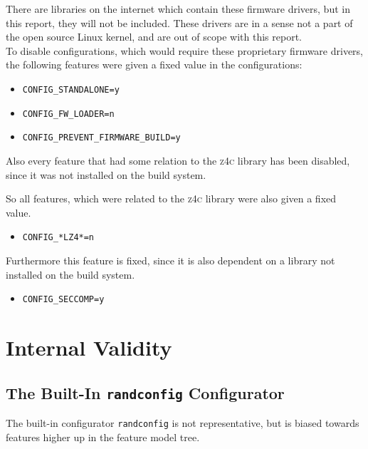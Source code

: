 \documentclass[a4paper,11pt]{report}
\newcommand{\textcode}[1]{\fboxsep=1pt\texttt{\colorbox{gray!20}{#1}}}
\begin{document}
There are libraries on the internet which contain these firmware drivers, but 
in this report, they will not be included. These drivers are in a sense not a 
part of the open source Linux kernel, and are out of scope with this report.
\\

To disable configurations, which would require these proprietary firmware 
drivers, the following features were given a fixed value in the configurations:

\begin{itemize}
    \item \textcode{CONFIG\_STANDALONE=y}
    \item \textcode{CONFIG\_FW\_LOADER=n}
    \item \textcode{CONFIG\_PREVENT\_FIRMWARE\_BUILD=y}
\end{itemize}


Also every feature that had some relation to the \textsc{z4c} library has been 
disabled, since it was not installed on the build system.

So all features, which were related to the \textsc{z4c} library were also given 
a fixed value.

\begin{itemize}
    \item \textcode{CONFIG\_*LZ4*=n}
\end{itemize}


Furthermore this feature is fixed, since it is also dependent on a library not 
installed on the build system.

\begin{itemize}
    \item \textcode{CONFIG\_SECCOMP=y}
\end{itemize}



            \section{Internal Validity}
            \label{sec:intval}

            \subsection*{The Built-In \texttt{randconfig} Configurator}
            \label{sec:randconfbias}

The built-in configurator \texttt{randconfig} is not representative, but is 
biased towards features higher up in the feature model tree. 
\end{document}
